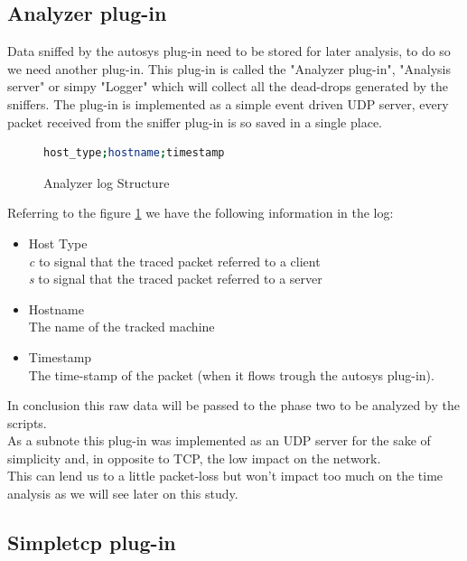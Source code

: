 \subsection{Analyzer plug-in}
Data sniffed by the autosys plug-in need to be stored for later analysis, 
to do so we need another plug-in.
This plug-in is called the "Analyzer plug-in", "Analysis server" or simpy "Logger"
which will collect all the dead-drops generated by the sniffers.
The plug-in is implemented as a simple event driven UDP server, every
packet received from the sniffer plug-in is so saved in a single place.
\begin{figure}[H]
\begin{lstlisting}[language=bash,frame=single]
host_type;hostname;timestamp
\end{lstlisting}
\caption{Analyzer log Structure}
\label{fig:analyzer_pack_struct}
\end{figure}
Referring to the figure \ref{fig:analyzer_pack_struct} we have the following
information in the log:
\begin{itemize}
\item Host Type \hfill \\
\emph{c} to signal that the traced packet referred to a client\\
\emph{s} to signal that the traced packet referred to a server
\item Hostname \hfill \\
The name of the tracked machine
\item Timestamp \hfill \\
The time-stamp of the packet (when it flows trough the autosys plug-in).
\end{itemize}

In conclusion this raw data will be passed to the phase two to be analyzed by the scripts.\\

As a subnote this plug-in was implemented as an UDP server for the sake of
simplicity and, in opposite to TCP, the low impact on the network.\\
This can lend us to a little packet-loss but won't impact too much on the time analysis
as we will see later on this study.

\subsection{Simpletcp plug-in}
